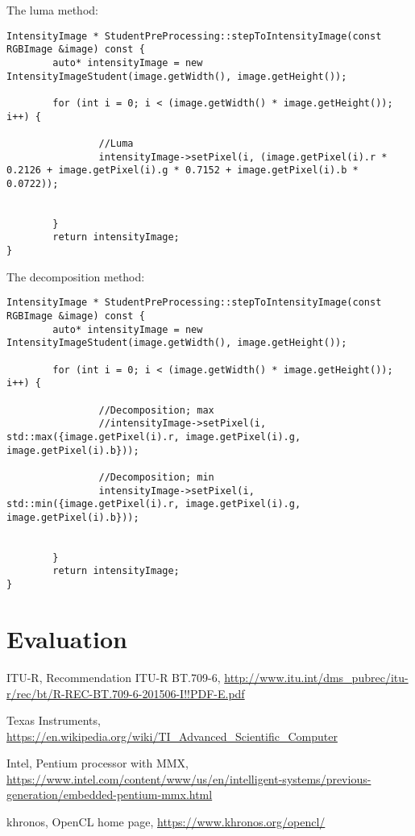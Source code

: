 \documentclass[a4paper]{article}
\begin{document}
The luma method:
\lstset{language=C++}
\begin{lstlisting}
IntensityImage * StudentPreProcessing::stepToIntensityImage(const RGBImage &image) const {
        auto* intensityImage = new IntensityImageStudent(image.getWidth(), image.getHeight());

        for (int i = 0; i < (image.getWidth() * image.getHeight()); i++) {

                //Luma
                intensityImage->setPixel(i, (image.getPixel(i).r * 0.2126 + image.getPixel(i).g * 0.7152 + image.getPixel(i).b * 0.0722));


        }
        return intensityImage;
}

\end{lstlisting}
\newpage

The decomposition method:
\lstset{language=C++}
\begin{lstlisting}
IntensityImage * StudentPreProcessing::stepToIntensityImage(const RGBImage &image) const {
        auto* intensityImage = new IntensityImageStudent(image.getWidth(), image.getHeight());

        for (int i = 0; i < (image.getWidth() * image.getHeight()); i++) {

                //Decomposition; max
                //intensityImage->setPixel(i, std::max({image.getPixel(i).r, image.getPixel(i).g, image.getPixel(i).b}));

                //Decomposition; min
                intensityImage->setPixel(i, std::min({image.getPixel(i).r, image.getPixel(i).g, image.getPixel(i).b}));


        }
        return intensityImage;
}

\end{lstlisting}

\section{Evaluation}

\begin{thebibliography}{9}

	ITU-R,
	Recommendation  ITU-R  BT.709-6,	
	\url{http://www.itu.int/dms_pubrec/itu-r/rec/bt/R-REC-BT.709-6-201506-I!!PDF-E.pdf}
  
	Texas Instruments,
	\url{https://en.wikipedia.org/wiki/TI_Advanced_Scientific_Computer}
 
Intel,
Pentium processor with MMX,
\url{https://www.intel.com/content/www/us/en/intelligent-systems/previous-generation/embedded-pentium-mmx.html}

khronos,
OpenCL home page,
\url{https://www.khronos.org/opencl/}

\end{thebibliography}
\end{document}
